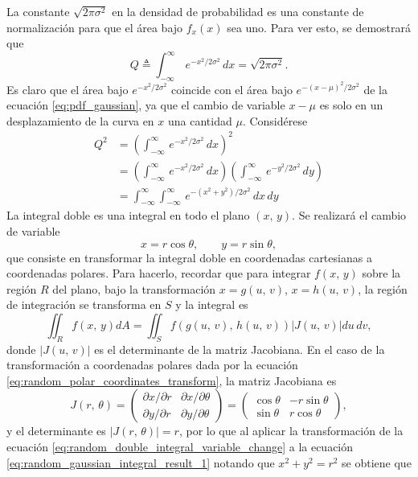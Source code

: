 \documentclass[a4paper]{report}
\begin{document}
La constante \(\sqrt{2\pi\sigma^2}\) en la densidad de probabilidad es una constante de normalización para que el área bajo \(f_x(x)\) sea uno. Para ver esto, se demostrará que
\[
 Q\triangleq\int_{-\infty}^{\infty}\,e^{-x^2/2\sigma^2}\,dx=\sqrt{2\pi\sigma^2}.
\]
Es claro que el área bajo \(e^{-x^2/2\sigma^2}\) coincide con el área bajo \(e^{-(x-\mu)^2/2\sigma^2}\) de la ecuación \ref{eq:pdf_gaussian}, ya que el cambio de variable \(x-\mu\) es solo en un desplazamiento de la curva en \(x\) una cantidad \(\mu\).
Considérese
\begin{align}\label{eq:random_gaussian_integral_result_1}
 Q^2&=\left(\int_{-\infty}^{\infty}\,e^{-x^2/2\sigma^2}\,dx\right)^2\nonumber\\
   &=\left(\int_{-\infty}^{\infty}\,e^{-x^2/2\sigma^2}\,dx\right)\left(\int_{-\infty}^{\infty}\,e^{-y^2/2\sigma^2}\,dy\right)\nonumber\\
   &=\int_{-\infty}^{\infty}\int_{-\infty}^{\infty}\,e^{-(x^2+y^2)/2\sigma^2}\,dx\,dy
\end{align}
La integral doble es una integral en todo el plano \((x,\,y)\). Se realizará el cambio de variable
\begin{equation}\label{eq:random_polar_coordinates_transform}
 x=r\cos\theta,\qquad y=r\sin\theta,
\end{equation}
que consiste en transformar la integral doble en coordenadas cartesianas a coordenadas polares. Para hacerlo, recordar que para integrar \(f(x,\,y)\) sobre la región \(R\) del plano, bajo la transformación \(x=g(u,\,v)\), \(x=h(u,\,v)\), la región de integración se transforma en \(S\) y la integral es
\begin{equation}\label{eq:random_double_integral_variable_change}
 \iint_{R}f(x,\,y)dA=\iint_{S}f(g(u,\,v),\,h(u,\,v))|J(u,\,v)|du\,dv,
\end{equation}
donde \(|J(u,\,v)|\) es el determinante de la matriz Jacobiana. En el caso de la transformación a coordenadas polares dada por la ecuación \ref{eq:random_polar_coordinates_transform}, la matriz Jacobiana es
\[
 J(r,\,\theta)=
 \begin{pmatrix}
    \partial x/\partial r & \partial x/\partial \theta \\
    \partial y/\partial r & \partial y/\partial \theta
\end{pmatrix}=
 \begin{pmatrix}
    \cos\theta & -r\sin\theta \\
    \sin\theta & r\cos\theta
 \end{pmatrix},
\]
y el determinante es \(|J(r,\,\theta)|=r\), por lo que al aplicar la transformación de la ecuación \ref{eq:random_double_integral_variable_change} a la ecuación \ref{eq:random_gaussian_integral_result_1} notando que \(x^2+y^2=r^2\) se obtiene que
\end{document}
